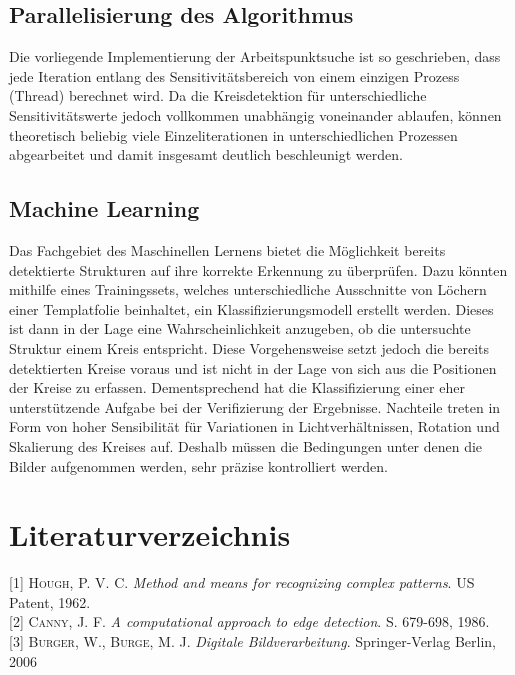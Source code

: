 \documentclass[accentcolor=tud1c, 11pt, toc=bib, toc=listof, captions=abovetable, parskip=half]{tudreport}
\begin{document}
\section{Parallelisierung des Algorithmus}
Die vorliegende Implementierung der Arbeitspunktsuche ist so geschrieben, dass jede Iteration entlang des Sensitivitätsbereich von einem einzigen Prozess (Thread) berechnet wird. Da die Kreisdetektion für unterschiedliche Sensitivitätswerte jedoch vollkommen unabhängig voneinander ablaufen, können theoretisch beliebig viele Einzeliterationen in unterschiedlichen Prozessen abgearbeitet und damit insgesamt deutlich beschleunigt werden.

\section{Machine Learning}
Das Fachgebiet des Maschinellen Lernens bietet die Möglichkeit bereits detektierte Strukturen auf ihre korrekte Erkennung zu überprüfen. Dazu könnten mithilfe eines Trainingssets, welches unterschiedliche Ausschnitte von Löchern einer Templatfolie beinhaltet, ein Klassifizierungsmodell erstellt werden. Dieses ist dann in der Lage eine Wahrscheinlichkeit anzugeben, ob die untersuchte Struktur einem Kreis entspricht. 
Diese Vorgehensweise setzt jedoch die bereits detektierten Kreise voraus und ist nicht in der Lage von sich aus die Positionen der Kreise zu erfassen. Dementsprechend hat die Klassifizierung einer eher unterstützende Aufgabe bei der Verifizierung der Ergebnisse.
Nachteile treten in Form von hoher Sensibilität für Variationen in Lichtverhältnissen, Rotation und Skalierung des Kreises auf. Deshalb müssen die Bedingungen unter denen die Bilder aufgenommen werden, sehr präzise kontrolliert werden.

\chapter{Literaturverzeichnis}

{[1]} \textsc{Hough, P. V. C}. \textit{Method and means for recognizing complex patterns}. US Patent, 1962.\\

{[2]} \textsc{Canny, J. F}. \textit{A computational approach to edge detection}. S. 679-698, 1986.\\

{[3]} \textsc{Burger, W., Burge, M. J}. \textit{Digitale Bildverarbeitung}. Springer-Verlag Berlin, 2006\\
\end{document}

